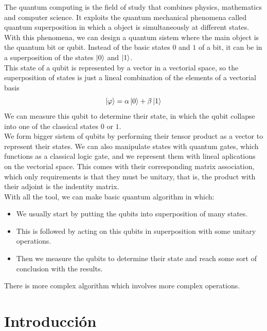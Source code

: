 \documentclass[a4paper]{article}
\numberwithin{equation}{section}
\begin{document}
The quantum computing is the field of study that combines physics, mathematics and computer science. It exploits the quantum mechanical phenomena called quantum superposition in which a object is simultaneously at different states. With this phenomena, we can design a quantum sistem where the main object is the quantum bit or qubit. Instead of the basic states $0$ and $1$ of a bit, it can be in a superposition of the states $\ket{0}$ and $\ket{1}$.\\
This state of a qubit is represented by a vector in a vectorial space, so the superposition of states is just a lineal combination of the elements of a vectorial basis
\begin{equation}
\ket{\varphi} = \alpha \ket{0} + \beta \ket{1}
\end{equation}
We can measure this qubit to determine their state, in which the qubit collapse into one of the classical states $0$ or $1$.\\
We form bigger sistem of qubits by performing their tensor product as a vector to represent their states. We can also manipulate states with quantum gates, which functions as a classical logic gate, and we represent them with lineal aplications on the vectorial space. This comes with their corresponding matrix association, which only requirements is that they must be unitary, that is, the product with their adjoint is the indentity matrix.\\
\linebreak
With all the tool, we can make basic quantum algorithm in which:
\begin{itemize}
\item We usually start by putting the qubits into superposition of many states.

\item This is followed by acting on this qubits in superposition with some unitary operations.

\item Then we measure the qubits to determine their state and reach some sort of conclusion with the results.
\end{itemize}
There is more complex algorithm which involves more complex operations.


\newpage

\tableofcontents

\newpage


\section{Introducción}
\end{document}
